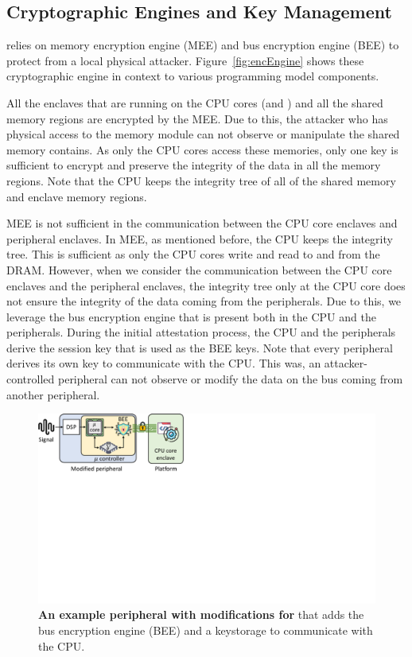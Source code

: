 \subsection{Cryptographic Engines and Key Management}

  \name relies on memory encryption engine (MEE) and bus encryption engine (BEE) to protect from a local physical attacker. Figure~\ref{fig:encEngine} shows these cryptographic engine in context to various \name programming model components.

  All the enclaves that are running on the CPU cores (\app and \ce) and all the shared memory regions are encrypted by the MEE. Due to this, the attacker who has physical access to the memory module can not observe or manipulate the shared memory contains. As only the CPU cores access these memories, only one key is sufficient to encrypt and preserve the integrity of the data in all the memory regions. Note that the CPU keeps the integrity tree of all of the shared memory and enclave memory regions.

  MEE is not sufficient in the communication between the CPU core enclaves and peripheral enclaves. In MEE, as mentioned before, the CPU keeps the integrity tree. This is sufficient as only the CPU cores write and read to and from the DRAM. However, when we consider the communication between the CPU core enclaves and the peripheral enclaves, the integrity tree only at the CPU core does not ensure the integrity of the data coming from the peripherals. Due to this, we leverage the bus encryption engine that is present both in the CPU and the peripherals. During the initial attestation process, the CPU and the peripherals derive the session key that is used as the BEE keys. Note that every peripheral derives its own key to communicate with the CPU. This was, an attacker-controlled peripheral can not observe or modify the data on the bus coming from another peripheral. 


 \begin{figure}[t]
   \centering
   \includegraphics[trim={0 13cm 18cm 0}, clip, width=0.7\linewidth]{chapters/PIE/images/peripheral.pdf}
   \caption[An example peripheral with modifications for \name{} that adds the bus encryption engine (BEE) and a keystorage to communicate with the CPU]{\textbf{An example peripheral with modifications for \name{}} that adds the bus encryption engine (BEE) and a keystorage to communicate with the CPU.}
   \label{fig:sensor}
 \end{figure}



